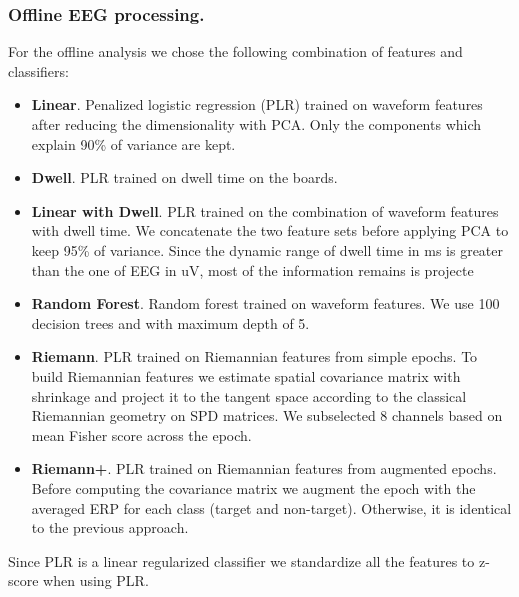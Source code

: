 \documentclass[12pt]{iopart}
\begin{document}
\subsubsection*{Offline EEG processing.}
For the offline analysis we chose the following combination of features and classifiers:
\begin{itemize}
    \item \textbf{Linear}. Penalized logistic regression (PLR) trained on waveform features after reducing
        the dimensionality with PCA. Only the components which explain 90\% of variance
        are kept. 
    \item \textbf{Dwell}. PLR trained on dwell time on the boards.
    \item \textbf{Linear with Dwell}. PLR trained on the combination of waveform features with dwell time. We concatenate
        the two feature sets before applying PCA to keep 95\% of variance. Since the dynamic
        range of dwell time in ms is greater than the one of EEG in uV, most of the information
        remains is projecte
    \item \textbf{Random Forest}. Random forest trained on waveform features. We use 100 decision trees and
        with maximum depth of 5.
    \item \textbf{Riemann}. PLR trained on Riemannian features from simple epochs.
        To build Riemannian features we
        estimate spatial covariance matrix with shrinkage and project it
        to the tangent space according to the classical Riemannian geometry on SPD matrices.
        We subselected 8 channels based on mean Fisher score across the epoch.
    \item \textbf{Riemann+}. PLR trained on Riemannian features from augmented epochs.
        Before computing the covariance matrix we augment the epoch with the averaged ERP
        for each class (target and non-target). Otherwise, it is identical to the previous
        approach.
\end{itemize}

Since PLR is a linear regularized classifier we standardize all the features to z-score when
using PLR.
\end{document}
